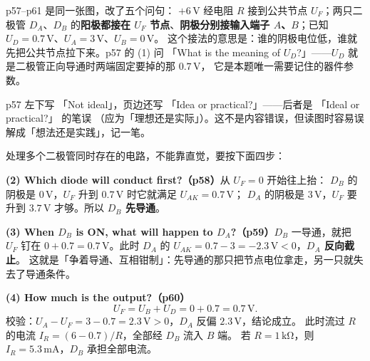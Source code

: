 \documentclass[11pt]{ctexart}
\begin{document}
p57--p61 是同一张图，改了五个问句：
$+6\,\mathrm{V}$ 经电阻 $R$ 接到公共节点 $U_F$；两只二极管 $D_A$、$D_B$ 的\textbf{阳极都接在
$U_F$ 节点}、\textbf{阴极分别接输入端子 $A$、$B$}；已知 $U_D=0.7\,\mathrm{V}$、$U_A=3\,\mathrm{V}$、$U_B=0\,\mathrm{V}$。
这个接法的意思是：谁的阴极电位低，谁就先把公共节点拉下来。p57 的 (1) 问
「What is the meaning of $U_D$?」——$U_D$ 就是二极管正向导通时两端固定要掉的那 $0.7\,\mathrm{V}$，
它是本题唯一需要记住的器件参数。

p57 左下写 「Not ideal」，页边还写 「Idea or practical?」——后者是 「Ideal or practical?」 的笔误
（应为「理想还是实际」）。这不是内容错误，但读图时容易误解成「想法还是实践」，记一笔。


处理多个二极管同时存在的电路，不能靠直觉，要按下面四步：



\textbf{(2) Which diode will conduct first?（p58）}从 $U_F=0$ 开始往上抬：
$D_B$ 的阴极是 $0\,\mathrm{V}$，$U_F$ 升到 $0.7\,\mathrm{V}$ 时它就满足 $U_{AK}=0.7\,\mathrm{V}$；
$D_A$ 的阴极是 $3\,\mathrm{V}$，$U_F$ 要升到 $3.7\,\mathrm{V}$ 才够。所以 \textbf{$D_B$ 先导通}。

\textbf{(3) When $D_B$ is ON, what will happen to $D_A$?（p59）}$D_B$ 一导通，就把 $U_F$ 钉在
$0+0.7=0.7\,\mathrm{V}$。此时 $D_A$ 的 $U_{AK}=0.7-3=-2.3\,\mathrm{V}<0$，\textbf{$D_A$ 反向截止}。
这就是「争着导通、互相钳制」：先导通的那只把节点电位拿走，另一只就失去了导通条件。

\textbf{(4) How much is the output?（p60）}
\[
U_F=U_B+U_D=0+0.7=0.7\,\mathrm{V}.
\]
校验：$U_A-U_F=3-0.7=2.3\,\mathrm{V}>0$，$D_A$ 反偏 $2.3\,\mathrm{V}$，结论成立。
此时流过 $R$ 的电流 $I_R=(6-0.7)/R$，全部经 $D_B$ 流入 $B$ 端。
若 $R=1\,\mathrm{k\Omega}$，则 $I_R=5.3\,\mathrm{mA}$，$D_B$ 承担全部电流。
\end{document}
